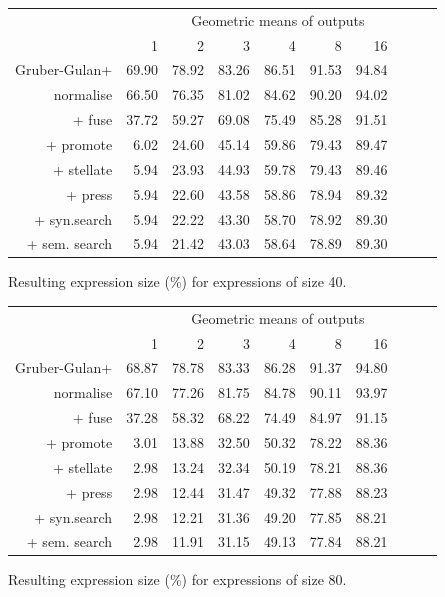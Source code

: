 \begin{figure}\begin{tabular}{rrrrrrrrrr}
 & \multicolumn{9}{c}{Geometric means of outputs} \\
 & 1 & 2 & 3 & 4 & 8 & 16 \\
Gruber-Gulan+ & 69.90 & 78.92 & 83.26 & 86.51 & 91.53 & 94.84 \\
normalise & 66.50 & 76.35 & 81.02 & 84.62 & 90.20 & 94.02 \\
+ fuse & 37.72 & 59.27 & 69.08 & 75.49 & 85.28 & 91.51 \\
+ promote & 6.02 & 24.60 & 45.14 & 59.86 & 79.43 & 89.47 \\
+ stellate & 5.94 & 23.93 & 44.93 & 59.78 & 79.43 & 89.46 \\
+ press & 5.94 & 22.60 & 43.58 & 58.86 & 78.94 & 89.32 \\
+ syn.search & 5.94 & 22.22 & 43.30 & 58.70 & 78.92 & 89.30 \\
+ sem. search & 5.94 & 21.42 & 43.03 & 58.64 & 78.89 & 89.30 \\
\end{tabular}\caption{Resulting expression size (\%) for expressions of size 40.}\end{figure}
\begin{figure}\begin{tabular}{rrrrrrrrrr}
 & \multicolumn{9}{c}{Geometric means of outputs} \\
 & 1 & 2 & 3 & 4 & 8 & 16 \\
Gruber-Gulan+ & 68.87 & 78.78 & 83.33 & 86.28 & 91.37 & 94.80 \\
normalise & 67.10 & 77.26 & 81.75 & 84.78 & 90.11 & 93.97 \\
+ fuse & 37.28 & 58.32 & 68.22 & 74.49 & 84.97 & 91.15 \\
+ promote & 3.01 & 13.88 & 32.50 & 50.32 & 78.22 & 88.36 \\
+ stellate & 2.98 & 13.24 & 32.34 & 50.19 & 78.21 & 88.36 \\
+ press & 2.98 & 12.44 & 31.47 & 49.32 & 77.88 & 88.23 \\
+ syn.search & 2.98 & 12.21 & 31.36 & 49.20 & 77.85 & 88.21 \\
+ sem. search & 2.98 & 11.91 & 31.15 & 49.13 & 77.84 & 88.21 \\
\end{tabular}\caption{Resulting expression size (\%) for expressions of size 80.}\end{figure}
